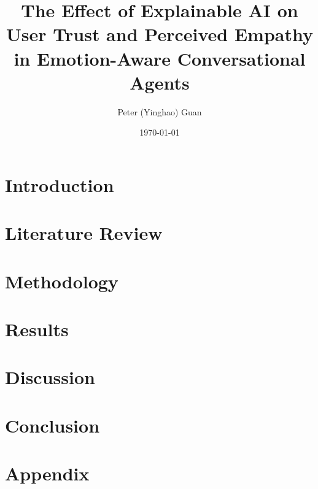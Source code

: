 \documentclass[12pt, a4paper]{article}
\title{\textbf{The Effect of Explainable AI on User Trust and Perceived Empathy in Emotion-Aware Conversational Agents}}
\author{Peter (Yinghao) Guan}
\date{\today}
\begin{document}
\maketitle


\lipsum[1]
\clearpage %

\tableofcontents
\clearpage %

\section{Introduction}

\clearpage

\section{Literature Review}

\clearpage

\section{Methodology}

\clearpage

\section{Results}

\clearpage

\section{Discussion}

\clearpage

\section{Conclusion}

\clearpage

\nocite{*}
\printbibliography
\clearpage

\appendix
\section*{Appendix}
% 
\end{document}
